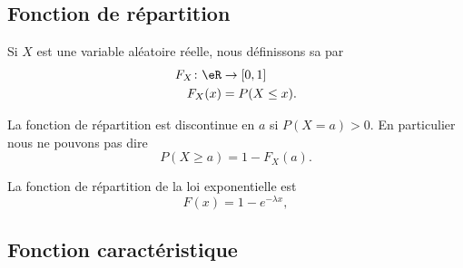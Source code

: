 
\subsection{Fonction de répartition}

\begin{definition}      \label{DefooYAZVooNdxDCx}
	Si \( X\) est une variable aléatoire réelle, nous définissons sa  par
	\begin{equation}
		\begin{aligned}
			F_X\colon \eR & \to \mathopen[ 0 , 1 \mathclose] \\
			F_X(x)        & =P(X\leq x).
		\end{aligned}
	\end{equation}
\end{definition}

\begin{remark}
	La fonction de répartition est discontinue en \( a\) si \( P(X=a)>0\). En particulier nous ne pouvons pas dire
	\begin{equation}
		P(X\geq a)=1-F_X(a).
	\end{equation}
\end{remark}

\begin{lemma}		\label{LEMooMNXJooBdGXWg}
	La fonction de répartition de la loi exponentielle est
	\begin{equation}
		F(x)=1- e^{-\lambda x},
	\end{equation}
\end{lemma}

\subsection{Fonction caractéristique}

